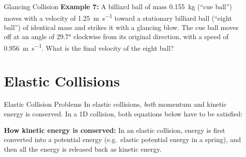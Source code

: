 \documentclass[12pt,compress,aspectratio=169]{beamer}
\begin{document}
\begin{frame}{Glancing Collision}
  \vspace{.3in}\textbf{Example 7:} A billiard ball of mass \SI{.155}{\kilo\gram}
  (``cue ball'') moves with a velocity of \SI{1.25}{\metre\per\second} toward
  a stationary billiard ball (``eight ball'') of identical mass and strikes it
  with a glancing blow. The cue ball moves off at an angle of \ang{29.7}
  clockwise from its original direction, with a speed of
  \SI{.956}{\metre\per\second}. What is the final velocity of the eight ball?
\end{frame}




\section{Elastic Collisions}

\begin{frame}{Elastic Collision Problems}
  In elastic collisions, \emph{both} momentum and kinetic energy is conserved.
  In a 1D collision, both equations below have to be satisfied:

  \vspace{-.2in}{\Large
    \begin{align*}
      \sum m_iv_i&=\sum m_iv_i'\\
      \sum\frac12 m_iv_i^2&=\sum\frac12 m_iv_i'^2
    \end{align*}
  }

  \textbf{How kinetic energy is conserved:} In an elastic collision, energy is
  first converted into a potential energy (e.g.\ elastic potential energy in a
  spring), and then all the energy is released back as kinetic energy.
\end{frame}
\end{document}
